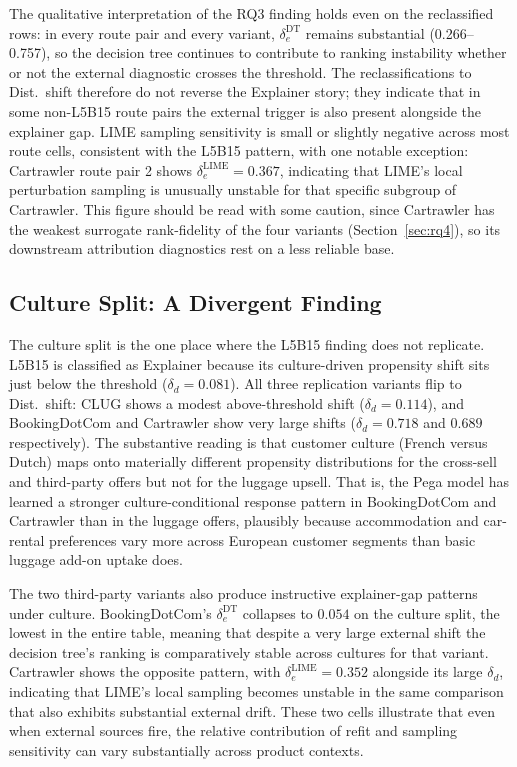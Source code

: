 \documentclass[oneside]{memoir} %
\begin{document}
The qualitative interpretation of the RQ3 finding holds even on the reclassified rows: in every route pair and every variant, $\delta_e^{\mathrm{DT}}$ remains substantial (0.266--0.757), so the decision tree continues to contribute to ranking instability whether or not the external diagnostic crosses the threshold. The reclassifications to Dist.\ shift therefore do not reverse the Explainer story; they indicate that in some non-L5B15 route pairs the external trigger is also present alongside the explainer gap. LIME sampling sensitivity is small or slightly negative across most route cells, consistent with the L5B15 pattern, with one notable exception: Cartrawler route pair 2 shows $\delta_e^{\mathrm{LIME}} = 0.367$, indicating that LIME's local perturbation sampling is unusually unstable for that specific subgroup of Cartrawler. This figure should be read with some caution, since Cartrawler has the weakest surrogate rank-fidelity of the four variants (Section~\ref{sec:rq4}), so its downstream attribution diagnostics rest on a less reliable base.

\subsection{Culture Split: A Divergent Finding}

The culture split is the one place where the L5B15 finding does not replicate. L5B15 is classified as Explainer because its culture-driven propensity shift sits just below the threshold ($\delta_d = 0.081$). All three replication variants flip to Dist.\ shift: CLUG shows a modest above-threshold shift ($\delta_d = 0.114$), and BookingDotCom and Cartrawler show very large shifts ($\delta_d = 0.718$ and $0.689$ respectively). The substantive reading is that customer culture (French versus Dutch) maps onto materially different propensity distributions for the cross-sell and third-party offers but not for the luggage upsell. That is, the Pega model has learned a stronger culture-conditional response pattern in BookingDotCom and Cartrawler than in the luggage offers, plausibly because accommodation and car-rental preferences vary more across European customer segments than basic luggage add-on uptake does.

The two third-party variants also produce instructive explainer-gap patterns under culture. BookingDotCom's $\delta_e^{\mathrm{DT}}$ collapses to $0.054$ on the culture split, the lowest in the entire table, meaning that despite a very large external shift the decision tree's ranking is comparatively stable across cultures for that variant. Cartrawler shows the opposite pattern, with $\delta_e^{\mathrm{LIME}} = 0.352$ alongside its large $\delta_d$, indicating that LIME's local sampling becomes unstable in the same comparison that also exhibits substantial external drift. These two cells illustrate that even when external sources fire, the relative contribution of refit and sampling sensitivity can vary substantially across product contexts.
\end{document}

